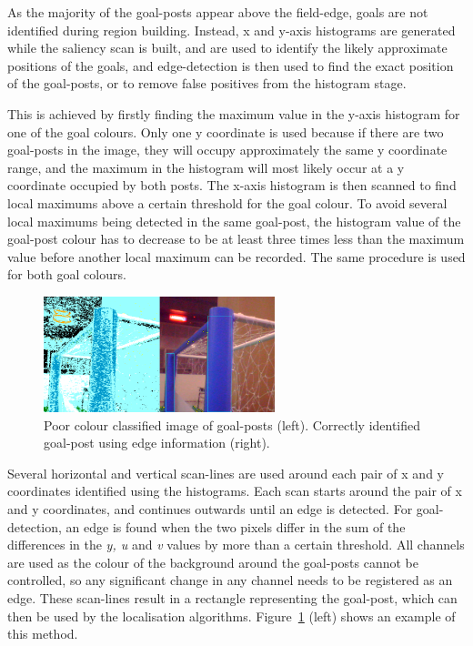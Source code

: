 \documentclass[runningheads,a4paper]{llncs}
\begin{document}
As the majority of the goal-posts appear above the field-edge, goals are not identified during region building. Instead, x and y-axis histograms are generated while the saliency scan is built, and are used to identify the likely approximate positions of the goals, and edge-detection is then used to find the exact position of the goal-posts, or to remove false positives from the histogram stage.

This is achieved by firstly finding the maximum value in the y-axis histogram
for one of the goal colours.  Only one y coordinate is used because if there are
two goal-posts in the image, they will occupy approximately the same y
coordinate range, and the maximum in the histogram will most likely occur at a y
coordinate occupied by both posts. The x-axis histogram is then scanned to find
local maximums above a certain threshold for the goal colour. To avoid several
local maximums being detected in the same goal-post, the histogram value of the
goal-post colour has to decrease to be at least three times less than the
maximum value before another local maximum can be recorded. The same procedure
is used for both goal colours.

\begin{figure} [ht]
\centering
\includegraphics[width=0.6\textwidth]{figures/goalDetection.png}
\caption{Poor colour classified image of goal-posts (left). Correctly identified
goal-post using edge information (right).} \label{figGoal}
\end{figure}

Several horizontal and vertical scan-lines are used around each pair of x and y coordinates identified using the histograms. Each scan starts around the pair of x and y coordinates, and continues outwards until an edge is detected. For goal-detection, an edge is found when the two pixels differ in the sum of the differences in the \emph{y, u} and \emph{v} values by more than a certain threshold. All channels are used as the colour of the background around the goal-posts cannot be controlled, so any significant change in any channel needs to be registered as an edge. These scan-lines result in a rectangle representing the goal-post, which can then be used by the localisation algorithms. Figure~\ref{figGoal} (left) shows an example of this method.
\end{document}
